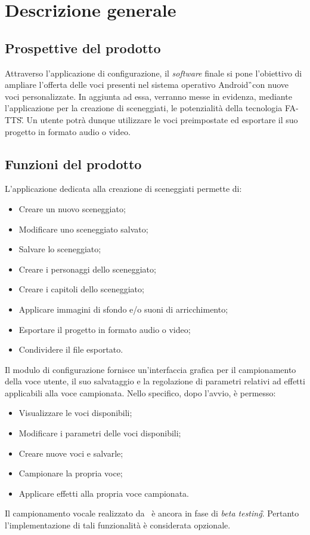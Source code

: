 \section{Descrizione generale}

\subsection{Prospettive del prodotto}
Attraverso l'applicazione di configurazione, il \textit{software} finale si pone l'obiettivo di ampliare l'offerta delle voci presenti nel sistema operativo Android\G\ con nuove voci personalizzate. In aggiunta ad essa, verranno messe in evidenza, mediante l'applicazione per la creazione di sceneggiati, le potenzialità della tecnologia FA-TTS\G. Un utente potrà dunque utilizzare le voci preimpostate ed esportare il suo progetto in formato audio o video.

\subsection{Funzioni del prodotto}
L'applicazione dedicata alla creazione di sceneggiati permette di:
\begin{itemize}
\item Creare un nuovo sceneggiato;
\item Modificare uno sceneggiato salvato;
\item Salvare lo sceneggiato;
\item Creare i personaggi dello sceneggiato;
\item Creare i capitoli dello sceneggiato;
\item Applicare immagini di sfondo e/o suoni di arricchimento;
\item Esportare il progetto in formato audio o video;
\item Condividere il file esportato. 
\end{itemize}
Il modulo di configurazione fornisce un'interfaccia grafica per il campionamento della voce utente, il suo salvataggio e la regolazione di parametri relativi ad effetti applicabili alla voce campionata. Nello specifico, dopo l'avvio, è permesso:
\begin{itemize}
\item Visualizzare le voci disponibili;
\item Modificare i parametri delle voci disponibili;
\item Creare nuove voci e salvarle;
\item Campionare la propria voce;
\item Applicare effetti alla propria voce campionata. 
\end{itemize}
Il campionamento vocale realizzato da \AZIENDA\ è ancora in fase di \textit{beta testing}\G. Pertanto l'implementazione di tali funzionalità è considerata opzionale.

